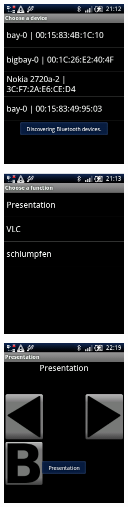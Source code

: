 \documentclass[ddc nogerman]{tudbeamer}
\begin{document}
\begin{frame}
    \includegraphics[height=\textheight]{img/choosedevice.png}
\end{frame}

\begin{frame}
    \includegraphics[height=\textheight]{img/choosefunction.png}
\end{frame}

\begin{frame}
	\includegraphics[height=\textheight]{img/presentation.png}
\end{frame}
\end{document}
